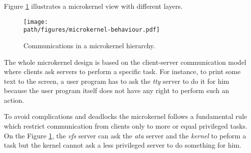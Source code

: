 Figure \ref{figure:microkernel} illustrates a microkernel view with different
layers.

\begin{figure}[h]
  \begin{center}
    \texttt{[image: \\path/figures/microkernel-behaviour.pdf]}
    \caption{Communications in a microkernel hierarchy.}
    \label{figure:microkernel}
  \end{center}
\end{figure}

The whole microkernel design is based on the client-server communication
model where clients ask servers to perform a specific task. For instance,
to print some text to the screen, a user program has to ask the \textit{tty}
server to do it for him because the user program itself does not have any
right to perform such an action.

To avoid complications and deadlocks the microkernel follows a fundamental
rule which restrict communication from clients only to more or equal
privileged tasks. On the Figure \ref{figure:microkernel}, the \textit{vfs}
server can ask the \textit{ata} server and the \textit{kernel} to peform a
task but the kernel cannot ask a less privileged server to do something for
him.
